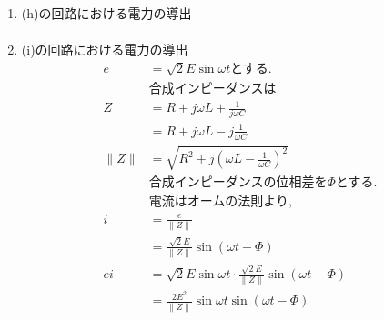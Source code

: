 \documentclass[twocolumn]{article}
\begin{document}
\begin{enumerate}
  \item (h)の回路における電力の導出
        \begin{align*}
        \end{align*}
  \item (i)の回路における電力の導出
        \begin{align*}
          e               & = \sqrt{2}E\sin\omega t\text{とする.}                                                                                                       \\
                          & \text{合成インピーダンスは}                                                                                                                        \\
          Z               & = R + j\omega L + \frac{1}{j\omega C}                                                                                                    \\
                          & = R + j\omega L -j \frac{1}{\omega C}                                                                                                    \\
          \|Z\|           & = \sqrt{R^2 + j{\left(\omega L - \frac{1}{\omega C}\right)}^2}                                                                           \\
                          & \text{合成インピーダンスの位相差を}\Phi\text{とする.}                                                                                                     \\
                          & \text{電流はオームの法則より,}                                                                                                                      \\
          i               & = \frac{e}{\|Z\|}                                                                                                                        \\
                          & = \frac{\sqrt{2}E}{\|Z\|}\sin \left(\omega t - \Phi\right)                                                                               \\
          ei              & = \sqrt{2}E\sin\omega t \cdot \frac{\sqrt{2}E}{\|Z\|}\sin \left(\omega t - \Phi\right)                                                   \\
                          & = \frac{2E^2}{\|Z\|}\sin\omega t  \sin \left(\omega t - \Phi\right)                                                                      \\

\end{align*}
\end{enumerate}
\end{document}
